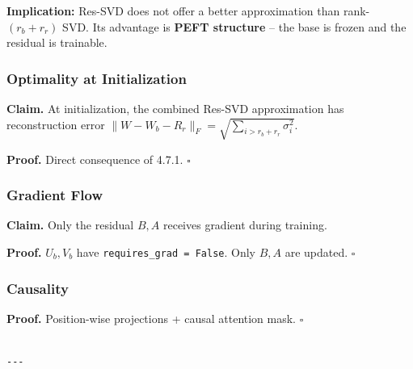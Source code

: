 \textbf{Implication:} Res-SVD does not offer a better approximation than 
rank-$(r_b + r_r)$ SVD. Its advantage is \textbf{PEFT structure} -- the base 
is frozen and the residual is trainable.

\subsubsection{Optimality at Initialization}

\textbf{Claim.} At initialization, the combined Res-SVD approximation has 
reconstruction error $\|W - W_b - R_r\|_F = \sqrt{\sum_{i > r_b+r_r} \sigma_i^2}$.

\textbf{Proof.} Direct consequence of 4.7.1. $\square$

\subsubsection{Gradient Flow}

\textbf{Claim.} Only the residual $B, A$ receives gradient during training.

\textbf{Proof.} $U_b, V_b$ have \texttt{requires\_grad = False}. Only $B, A$ are updated. $\square$

\subsubsection{Causality}

\textbf{Proof.} Position-wise projections + causal attention mask. $\square$
\begin{lstlisting}

---
\end{lstlisting}